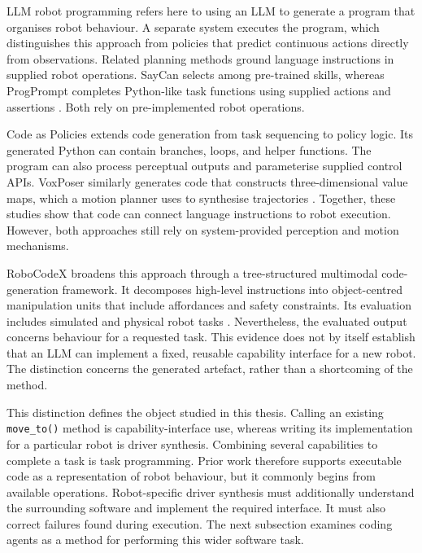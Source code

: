 LLM robot programming refers here to using an LLM to generate a program that
organises robot behaviour. A separate system executes the program, which
distinguishes this approach from policies that predict continuous actions
directly from observations. Related planning methods ground language
instructions in supplied robot operations. SayCan selects among pre-trained skills, whereas
ProgPrompt completes Python-like task functions using supplied actions and
assertions \citep{ahn2022saycan,singh2023progprompt}. Both rely on
pre-implemented robot operations.

Code as Policies extends code generation from task sequencing to policy logic.
Its generated Python can contain branches, loops, and helper functions. The
program can also process perceptual outputs and parameterise supplied control
APIs. VoxPoser similarly generates code that constructs three-dimensional
value maps, which a motion planner uses to synthesise trajectories
\citep{liang2023codeaspolicies,huang2023voxposer}. Together, these studies show
that code can connect language instructions to robot execution. However, both
approaches still rely on system-provided perception and motion mechanisms.

RoboCodeX broadens this approach through a tree-structured multimodal
code-generation framework. It decomposes high-level instructions into
object-centred manipulation units that include affordances and safety
constraints. Its evaluation includes simulated and physical robot tasks
\citep{mu2024robocodex}. Nevertheless, the evaluated output concerns behaviour
for a requested task. This evidence does not by itself establish that an LLM
can implement a fixed, reusable capability interface for a new robot. The
distinction concerns the generated artefact, rather than a shortcoming of the
method.

This distinction defines the object studied in this thesis. Calling an
existing \texttt{move\_to()} method is capability-interface use, whereas
writing its implementation for a particular robot is driver synthesis.
Combining several capabilities to complete a task is task programming. Prior
work therefore supports executable code as a representation of robot
behaviour, but it commonly begins from available operations. Robot-specific
driver synthesis must additionally understand the surrounding software and
implement the required interface. It must also correct failures found during
execution. The next subsection examines coding agents as a method for
performing this wider software task.

